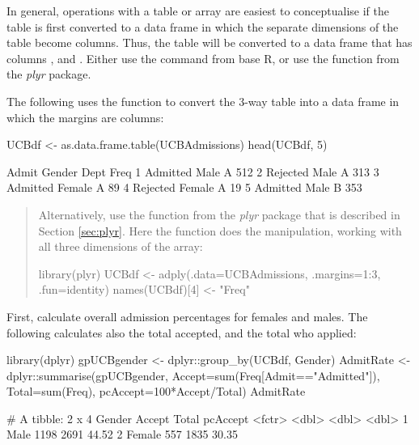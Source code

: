 In general, operations with a table or array are easiest to
conceptualise if the table is first converted to a data frame
in which the separate dimensions of the table become columns.
Thus, the  table will be converted to
a data frame that has columns ,  and
. Either use the 
command from base R, or use the  function from
the {\em plyr} package.

The following uses the function  to convert
the 3-way table  into a data frame in which the
margins are columns:
\begin{Schunk}
\begin{Sinput}
UCBdf <- as.data.frame.table(UCBAdmissions)
head(UCBdf, 5)
\end{Sinput}
\begin{Soutput}
     Admit Gender Dept Freq
1 Admitted   Male    A  512
2 Rejected   Male    A  313
3 Admitted Female    A   89
4 Rejected Female    A   19
5 Admitted   Male    B  353
\end{Soutput}
\end{Schunk}
\begin{quote}
{\small
Alternatively, use the function 
  from the {\em plyr} package that is described in Section
  \ref{sec:plyr}. Here the  function does the
manipulation, working with all three dimensions of the array:
\begin{Schunk}
\begin{Sinput}
library(plyr)
UCBdf <- adply(.data=UCBAdmissions,
               .margins=1:3,
               .fun=identity)
names(UCBdf)[4] <- "Freq"
\end{Sinput}
\end{Schunk}
}
\end{quote}
First, calculate overall admission percentages for
females and males. The following calculates also the total accepted,
and the total who applied:
\begin{fullwidth}

\begin{Schunk}
\begin{Sinput}
library(dplyr)
gpUCBgender <- dplyr::group_by(UCBdf, Gender)
AdmitRate <- dplyr::summarise(gpUCBgender,
                              Accept=sum(Freq[Admit=="Admitted"]),
                              Total=sum(Freq),
                              pcAccept=100*Accept/Total)
AdmitRate
\end{Sinput}
\begin{Soutput}
# A tibble: 2 x 4
  Gender Accept Total pcAccept
  <fctr>  <dbl> <dbl>    <dbl>
1   Male   1198  2691    44.52
2 Female    557  1835    30.35
\end{Soutput}
\end{Schunk}

\end{fullwidth}

